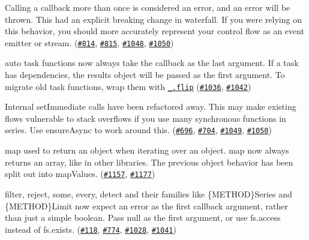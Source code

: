 \begin{DoxyItemize}
\item Calling a callback more than once is considered an error, and an error will be thrown. This had an explicit breaking change in {\ttfamily waterfall}. If you were relying on this behavior, you should more accurately represent your control flow as an event emitter or stream. (\href{https://github.com/caolan/async/issues/814}{\tt \#814}, \href{https://github.com/caolan/async/issues/815}{\tt \#815}, \href{https://github.com/caolan/async/issues/1048}{\tt \#1048}, \href{https://github.com/caolan/async/issues/1050}{\tt \#1050})
\item {\ttfamily auto} task functions now always take the callback as the last argument. If a task has dependencies, the {\ttfamily results} object will be passed as the first argument. To migrate old task functions, wrap them with \href{https://lodash.com/docs#flip}{\tt {\ttfamily \+\_\+.\+flip}} (\href{https://github.com/caolan/async/issues/1036}{\tt \#1036}, \href{https://github.com/caolan/async/issues/1042}{\tt \#1042})
\item Internal {\ttfamily set\+Immediate} calls have been refactored away. This may make existing flows vulnerable to stack overflows if you use many synchronous functions in series. Use {\ttfamily ensure\+Async} to work around this. (\href{https://github.com/caolan/async/issues/696}{\tt \#696}, \href{https://github.com/caolan/async/issues/704}{\tt \#704}, \href{https://github.com/caolan/async/issues/1049}{\tt \#1049}, \href{https://github.com/caolan/async/issues/1050}{\tt \#1050})
\item {\ttfamily map} used to return an object when iterating over an object. {\ttfamily map} now always returns an array, like in other libraries. The previous object behavior has been split out into {\ttfamily map\+Values}. (\href{https://github.com/caolan/async/issues/1157}{\tt \#1157}, \href{https://github.com/caolan/async/issues/1177}{\tt \#1177})
\item {\ttfamily filter}, {\ttfamily reject}, {\ttfamily some}, {\ttfamily every}, {\ttfamily detect} and their families like {\ttfamily \{M\+E\+T\+H\+OD\}Series} and {\ttfamily \{M\+E\+T\+H\+OD\}Limit} now expect an error as the first callback argument, rather than just a simple boolean. Pass {\ttfamily null} as the first argument, or use {\ttfamily fs.\+access} instead of {\ttfamily fs.\+exists}. (\href{https://github.com/caolan/async/issues/118}{\tt \#118}, \href{https://github.com/caolan/async/issues/774}{\tt \#774}, \href{https://github.com/caolan/async/issues/1028}{\tt \#1028}, \href{https://github.com/caolan/async/issues/1041}{\tt \#1041})

\end{DoxyItemize}
